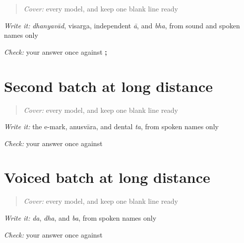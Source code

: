 \label{lesson:MR-R18-script-a-r4}



\begin{quote}
\emph{Cover:} every model, and keep one blank line ready
\end{quote}

\begin{tcolorbox}[breakable,colback=teal!4,colframe=teal!35!black,title={Before you move on}]
\emph{Write it:} \emph{dhanyavād}, visarga, independent \emph{ā}, and \emph{bha}, from sound and spoken names only

\emph{Check:} your answer once against \textbf{;   }
\end{tcolorbox}
\section[\texorpdfstring{\mr{े} / \mr{ं} / \mr{त} (e / anusvara / ta)}{े / ं / त (e / anusvara / ta)}]{Second batch at long distance}

\label{lesson:MR-R18-script-b-r4}



\begin{quote}
\emph{Cover:} every model, and keep one blank line ready
\end{quote}

\begin{tcolorbox}[breakable,colback=teal!4,colframe=teal!35!black,title={Before you move on}]
\emph{Write it:} the e-mark, anusvāra, and dental \emph{ta}, from spoken names only

\emph{Check:} your answer once against \textbf{  }
\end{tcolorbox}
\section[\texorpdfstring{\mr{द} / \mr{ध} / \mr{ब} (da / dha / ba)}{द / ध / ब (da / dha / ba)}]{Voiced batch at long distance}

\label{lesson:MR-R18-script-c-r4}



\begin{quote}
\emph{Cover:} every model, and keep one blank line ready
\end{quote}

\begin{tcolorbox}[breakable,colback=teal!4,colframe=teal!35!black,title={Before you move on}]
\emph{Write it:} \emph{da}, \emph{dha}, and \emph{ba}, from spoken names only

\emph{Check:} your answer once against \textbf{  }
\end{tcolorbox}
